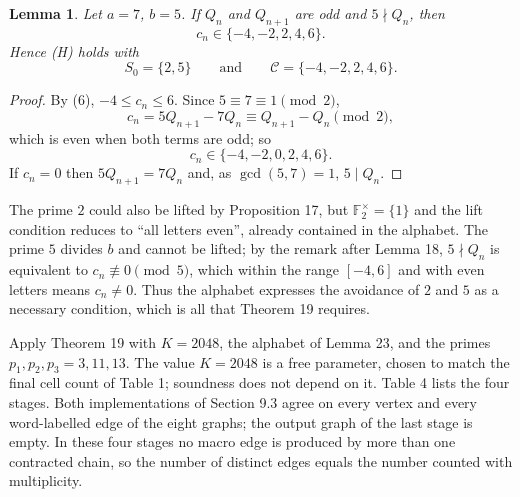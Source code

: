 \documentclass[11pt,reqno]{amsart}
\newtheorem{lemma}[theorem]{Lemma}
\theoremstyle{definition}
\theoremstyle{remark}
\begin{document}
\begin{samepage}
\begin{lemma}\leavevmode\label{thm:23}
Let \(a=7\), \(b=5\). If \(Q_n\) and \(Q_{n+1}\) are odd
and \(5\nmid Q_n\), then
\[
c_n\in\{-4,-2,2,4,6\}.
\]
Hence (H) holds
with
\[
S_0=\{2,5\}\qquad \text{and}\qquad \mathcal C=\{-4,-2,2,4,6\}.
\]
\label{thm-end:23}
\end{lemma}
\end{samepage}

\begin{proof}\leavevmode\label{proof:23}
By (6), \(-4\le c_n\le6\). Since \(5\equiv7\equiv1\pmod2\),
\[
c_n=5Q_{n+1}-7Q_n\equiv Q_{n+1}-Q_n\pmod2,
\]
which is even when both
terms are odd; so
\[
c_n\in\{-4,-2,0,2,4,6\}.
\]
If \(c_n=0\) then
\(5Q_{n+1}=7Q_n\) and, as \(\gcd(5,7)=1\), \(5\mid Q_n\). \qedhere
\end{proof}

The prime \(2\) could also be lifted by Proposition 17, but
\(\mathbb F_2^\times=\{1\}\) and the lift condition reduces to
``all letters even'', already contained in the alphabet. The prime
\(5\) divides \(b\) and cannot be lifted; by the remark after Lemma 18,
\(5\nmid Q_n\) is equivalent to \(c_n\not\equiv0\pmod5\), which within
the range \([-4,6]\) and with even letters means \(c_n\ne0\). Thus the
alphabet expresses the avoidance of \(2\) and \(5\) as a necessary
condition, which is all that Theorem 19 requires.

Apply Theorem 19 with \(K=2048\), the alphabet of Lemma 23, and the
primes \(p_1,p_2,p_3=3,11,13\). The value \(K=2048\) is a free
parameter, chosen to match the final cell count of Table 1; soundness
does not depend on it. Table 4 lists the four stages. Both
implementations of Section 9.3 agree on every vertex and every
word-labelled edge of the eight graphs; the output graph of the last
stage is empty. In these four stages no macro edge is produced by more
than one contracted chain, so the number of distinct edges equals the
number counted with multiplicity.

\end{document}
